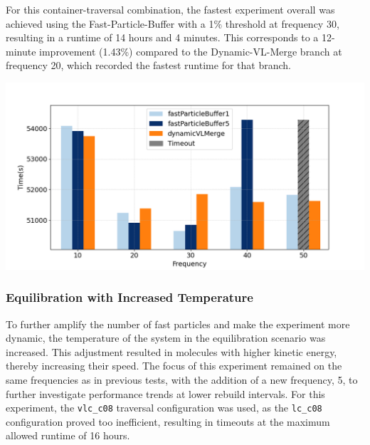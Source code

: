 For this container-traversal combination, the fastest experiment overall was achieved using the Fast-Particle-Buffer with a 1\% threshold at frequency 30, resulting in a runtime of 14 hours and 4 minutes. This corresponds to a 12-minute improvement (1.43\%) compared to the Dynamic-VL-Merge branch at frequency 20, which recorded the fastest runtime for that branch.


\begin{center}
    \includegraphics[width=0.8\linewidth]{graphs/spinodalDecomposition/lcc08.png}
    \captionsetup{hypcap=false}
    \label{fig:equ_normla_lcc08}
\end{center}
    
    



\subsubsection{Equilibration with Increased Temperature}

To further amplify the number of fast particles and make the experiment more dynamic, the temperature of the system in the equilibration scenario was increased. This adjustment resulted in molecules with higher kinetic energy, thereby increasing their speed. The focus of this experiment remained on the same frequencies as in previous tests, with the addition of a new frequency, 5, to further investigate performance trends at lower rebuild intervals. For this experiment, the \texttt{vlc\_c08} traversal configuration was used, as the \texttt{lc\_c08} configuration proved too inefficient, resulting in timeouts at the maximum allowed runtime of 16 hours.

